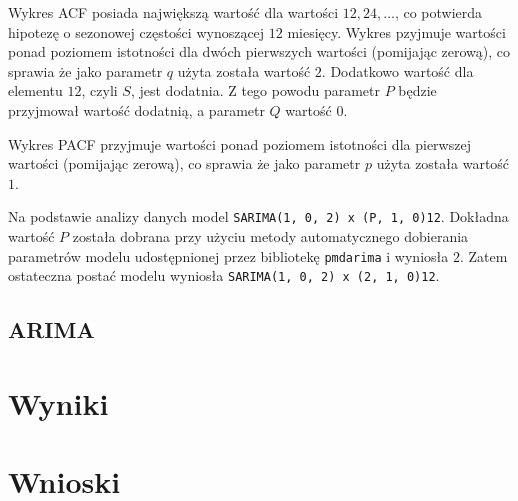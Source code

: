 \documentclass[12pt]{article}
\begin{document}
Wykres ACF posiada największą wartość dla wartości $12, 24, \dots$, co potwierda hipotezę o sezonowej częstości wynoszącej $12$ miesięcy. Wykres pzyjmuje wartości ponad poziomem istotności dla dwóch pierwszych wartości (pomijając zerową), co sprawia że jako parametr $q$ użyta została wartość $2$. Dodatkowo wartość dla elementu $12$, czyli $S$, jest dodatnia. Z tego powodu parametr $P$ będzie przyjmował wartość dodatnią, a parametr $Q$ wartość $0$.

Wykres PACF przyjmuje wartości ponad poziomem istotności dla pierwszej wartości (pomijając zerową), co sprawia że jako parametr $p$ użyta została wartość $1$.

Na podstawie analizy danych model \texttt{SARIMA(1, 0, 2) x (P, 1, 0)12}. Dokładna wartość $P$ została dobrana przy użyciu metody automatycznego dobierania parametrów modelu udostępnionej przez bibliotekę \texttt{pmdarima} i wyniosła $2$. Zatem ostateczna postać modelu wyniosła \texttt{SARIMA(1, 0, 2) x (2, 1, 0)12}.

\subsection{ARIMA}



\section{Wyniki}

\section{Wnioski}
\end{document}
